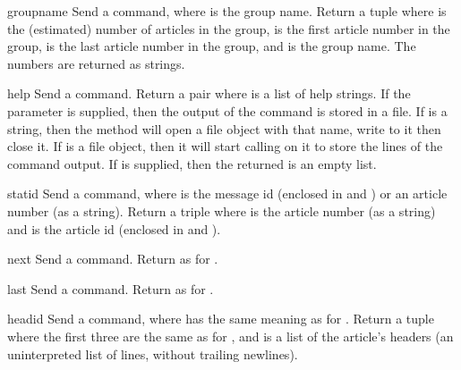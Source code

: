 \begin{methoddesc}{group}{name}
Send a  command, where  is the group name.
Return a tuple  where  is the (estimated) number
of articles in the group,  is the first article number in
the group,  is the last article number in the group, and
 is the group name.  The numbers are returned as strings.
\end{methoddesc}

\begin{methoddesc}{help}{}
Send a  command.  Return a pair  where  is a list of help strings.
If the  parameter is supplied, then the output of the 
 command is stored in a file.  If  is a string, 
then the method will open a file object with that name, write to it 
then close it.  If  is a file object, then it will start
calling  on it to store the lines of the command output.
If  is supplied, then the returned  is an empty list.
\end{methoddesc}

\begin{methoddesc}{stat}{id}
Send a  command, where  is the message id (enclosed
in \character{<} and \character{>}) or an article number (as a string).
Return a triple  where
 is the article number (as a string) and  is the
article id  (enclosed in \character{<} and \character{>}).
\end{methoddesc}

\begin{methoddesc}{next}{}
Send a  command.  Return as for .
\end{methoddesc}

\begin{methoddesc}{last}{}
Send a  command.  Return as for .
\end{methoddesc}

\begin{methoddesc}{head}{id}
Send a  command, where  has the same meaning as for
.  Return a tuple
where the first three are the same as for ,
and  is a list of the article's headers (an uninterpreted
list of lines, without trailing newlines).
\end{methoddesc}

